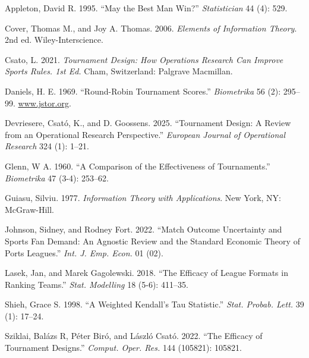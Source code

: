 \documentclass[
  12pt,
]{article}
\newlength{\cslhangindent}
\newenvironment{CSLReferences}[2] %
 {\begin{list}{}{%
  \setlength{\itemindent}{0pt}
  \setlength{\leftmargin}{0pt}
  \setlength{\parsep}{0pt}
  \ifodd #1
   \setlength{\leftmargin}{\cslhangindent}
   \setlength{\itemindent}{-1\cslhangindent}
  \fi
  \setlength{\itemsep}{#2\baselineskip}}}
 {\end{list}}
\begin{document}
\label{refs}
\begin{CSLReferences}{1}{0}
Appleton, David R. 1995. {``May the Best Man Win?''} \emph{Statistician}
44 (4): 529.

Cover, Thomas M., and Joy A. Thomas. 2006. \emph{Elements of Information
Theory}. 2nd ed. Wiley-Interscience.

Csato, L. 2021. \emph{Tournament Design: How Operations Research Can
Improve Sports Rules. 1st Ed.} Cham, Switzerland: Palgrave Macmillan.

Daniels, H. E. 1969. {``{Round-Robin Tournament Scores}.''}
\emph{Biometrika} 56 (2): 295--99.
\href{https://www.jstor.org}{www.jstor.org}.

Devriesere, Csató, K., and D. Goossens. 2025. {``Tournament Design: A
Review from an Operational Research Perspective.''} \emph{European
Journal of Operational Research} 324 (1): 1--21.

Glenn, W A. 1960. {``A Comparison of the Effectiveness of
Tournaments.''} \emph{Biometrika} 47 (3-4): 253--62.

Guiasu, Silviu. 1977. \emph{Information Theory with Applications}. New
York, NY: McGraw-Hill.

Johnson, Sidney, and Rodney Fort. 2022. {``Match Outcome Uncertainty and
Sports Fan Demand: An Agnostic Review and the Standard Economic Theory
of Ports Leagues.''} \emph{Int. J. Emp. Econ.} 01 (02).

Lasek, Jan, and Marek Gagolewski. 2018. {``The Efficacy of League
Formats in Ranking Teams.''} \emph{Stat. Modelling} 18 (5-6): 411--35.

Shieh, Grace S. 1998. {``A Weighted Kendall's Tau Statistic.''}
\emph{Stat. Probab. Lett.} 39 (1): 17--24.

Sziklai, Balázs R, Péter Biró, and László Csató. 2022. {``The Efficacy
of Tournament Designs.''} \emph{Comput. Oper. Res.} 144 (105821):
105821.

\end{CSLReferences}
\end{document}
